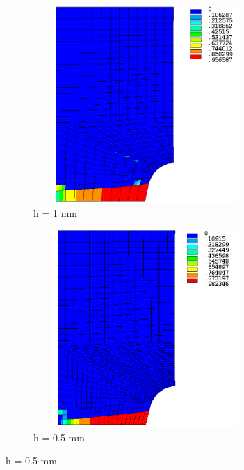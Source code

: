 \documentclass[12pt,a4paper,twoside,openright]{report}
\begin{document}
\begin{figure}[htbp!]
     \captionsetup[subfigure]{justification=centering}
      \begin{subfigure}{0.45\textwidth}
      \centering
         \includegraphics[width=8.5cm,height=7.5cm,keepaspectratio]{25.d2-1.png}
         \caption{h = 1 mm}
         \label{fig:d2-1}
     \end{subfigure}
     \hspace{1.5cm}
     \begin{subfigure}{0.45\textwidth}
     \centering
         \includegraphics[width=8.5cm,height=7.5cm,keepaspectratio]{25.d2-0.5.png}
         \caption{h = 0.5 mm}
         \label{fig:d2-0.5}
     \end{subfigure}
\end{figure}
\FloatBarrier
\end{document}
